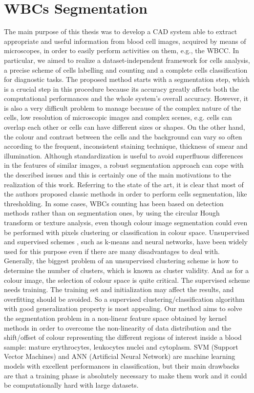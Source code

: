 \documentclass[final,a4paper,12pt,english]{UnicaPhdThesis3}
\begin{document}
\chapter{WBCs Segmentation}
The main purpose of this thesis was to develop a CAD system able to extract appropriate and useful information from blood cell images, acquired by means of microscopes, in order to easily perform activities on them, e.g., the WBCC. In particular, we aimed to realize a dataset-independent framework for cells analysis, a precise scheme of cells labelling and counting and a complete cells classification for diagnostic tasks.
The proposed method starts with a segmentation step, which is a crucial step in this procedure because its accuracy greatly affects both the computational performances and the whole system's overall accuracy. However, it is also a very difficult problem to manage because of the complex nature of the cells, low resolution of microscopic images and complex scenes, e.g. cells can overlap each other or cells can have different sizes or shapes. On the other hand, the colour and contrast between the cells and the background can vary so often according to the frequent, inconsistent staining technique, thickness of smear and illumination. Although standardization is useful to avoid superfluous differences in the features of similar images, a robust segmentation approach can cope with the described issues and this is certainly one of the main motivations to the realization of this work.
Referring to the state of the art, it is clear that most of the authors proposed classic methods in order to perform cells segmentation, like thresholding. In some cases, WBCs counting has been based on detection methods rather than on segmentation ones, by using the circular Hough transform \cite{Mahmood} or texture analysis, even though colour image segmentation could even be performed with pixels clustering or classification in colour space. Unsupervised and supervised schemes \cite{Pan}, such as k-means and neural networks, have been widely used for this purpose even if there are many disadvantages to deal with. Generally, the biggest problem of an unsupervised clustering scheme is how to determine the number of clusters, which is known as cluster validity. And as for a colour image, the selection of colour space is quite critical. The supervised scheme needs training. The training set and initialization may affect the results, and overfitting should be avoided. So a supervised clustering/classification algorithm with good generalization property is most appealing. Our method aims to solve the segmentation problem in a non-linear feature space obtained by kernel methods in order to overcome the non-linearity of data distribution and the shift/offset of colour representing the different regions of interest inside a blood sample: mature erythrocytes, leukocytes nuclei and cytoplasm. SVM (Support Vector Machines) and ANN (Artificial Neural Network) are machine learning models with excellent performances in classification, but their main drawbacks are that a training phase is absolutely necessary to make them work and it could be computationally hard with large datasets.
\end{document}
